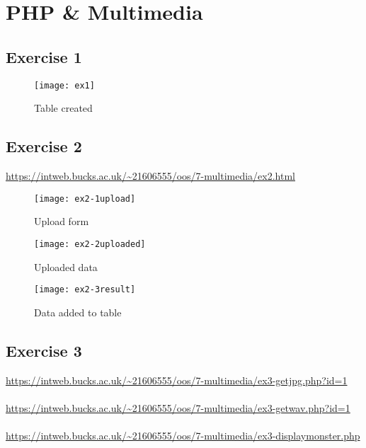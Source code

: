 \chapter{PHP \& Multimedia}
\graphicspath{{7-multimedia/images/}}

\section{Exercise 1}

\begin{figure}[H]
  \caption{Table created}
  \centering
  \texttt{[image: ex1]}
\end{figure}

\clearpage
\section{Exercise 2}

\url{https://intweb.bucks.ac.uk/~21606555/oos/7-multimedia/ex2.html}

\captionsetup{type=figure}


\captionsetup{type=figure}


\begin{figure}[H]
  \caption{Upload form}
  \centering
  \texttt{[image: ex2-1upload]}
\end{figure}

\begin{figure}[H]
  \caption{Uploaded data}
  \centering
  \texttt{[image: ex2-2uploaded]}
\end{figure}

\begin{figure}[H]
  \caption{Data added to table}
  \centering
  \texttt{[image: ex2-3result]}
\end{figure}

\clearpage
\section{Exercise 3}

\url{https://intweb.bucks.ac.uk/~21606555/oos/7-multimedia/ex3-getjpg.php?id=1}\\\\
\url{https://intweb.bucks.ac.uk/~21606555/oos/7-multimedia/ex3-getwav.php?id=1}\\\\
\url{https://intweb.bucks.ac.uk/~21606555/oos/7-multimedia/ex3-displaymonster.php}

